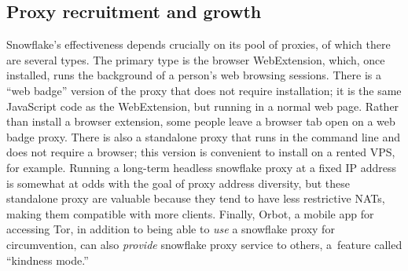 \documentclass[letterpaper,twocolumn]{article}
\begin{document}

\subsection{Proxy recruitment and growth}
\label{sec:proxies}

Snowflake's effectiveness depends crucially on its pool of proxies,
of which there are several types.
The primary type is the browser WebExtension,
which, once installed, runs the background of a person's web browsing sessions.
There is a ``web badge'' version of the proxy that does not require installation;
it is the same JavaScript code as the WebExtension, but running in a normal web page.
Rather than install a browser extension,
some people leave a browser tab open on a web badge proxy.
There is also a standalone proxy that runs in the command line
and does not require a browser;
this version is convenient to install on a rented VPS, for example.
Running a long-term headless snowflake proxy at a fixed IP address
is somewhat at odds with the goal of proxy address diversity,
but these standalone proxy are valuable because
they tend to have less restrictive NATs,
making them compatible with more clients.
Finally, Orbot, a mobile app for accessing Tor,
in addition to being able to \emph{use} a snowflake proxy for circumvention,
can also \emph{provide} snowflake proxy service to others,
a~feature called ``kindness mode.''
\end{document}
